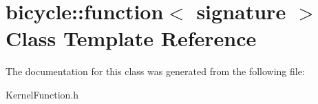 \hypertarget{classbicycle_1_1function}{}\section{bicycle\+:\+:function$<$ signature $>$ Class Template Reference}
\label{classbicycle_1_1function}


The documentation for this class was generated from the following file\+:\begin{DoxyCompactItemize}
\item 
Kernel\+Function.\+h\end{DoxyCompactItemize}
